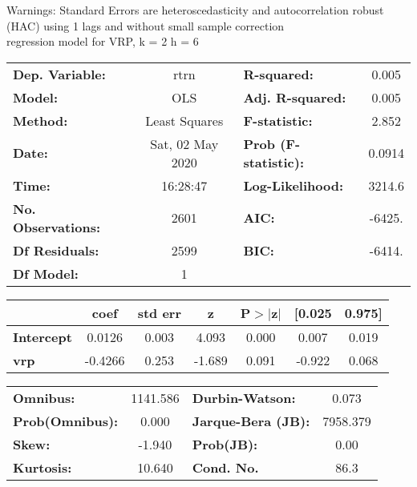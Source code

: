 Warnings: \newline
 [1] Standard Errors are heteroscedasticity and autocorrelation robust (HAC) using 1 lags and without small sample correction\\ 

regression model for VRP, k = 2 h = 6\begin{center}
\begin{tabular}{lclc}
\toprule
\textbf{Dep. Variable:}    &       rtrn       & \textbf{  R-squared:         } &     0.005   \\
\textbf{Model:}            &       OLS        & \textbf{  Adj. R-squared:    } &     0.005   \\
\textbf{Method:}           &  Least Squares   & \textbf{  F-statistic:       } &     2.852   \\
\textbf{Date:}             & Sat, 02 May 2020 & \textbf{  Prob (F-statistic):} &   0.0914    \\
\textbf{Time:}             &     16:28:47     & \textbf{  Log-Likelihood:    } &    3214.6   \\
\textbf{No. Observations:} &        2601      & \textbf{  AIC:               } &    -6425.   \\
\textbf{Df Residuals:}     &        2599      & \textbf{  BIC:               } &    -6414.   \\
\textbf{Df Model:}         &           1      & \textbf{                     } &             \\
\bottomrule
\end{tabular}
\begin{tabular}{lcccccc}
                   & \textbf{coef} & \textbf{std err} & \textbf{z} & \textbf{P$> |$z$|$} & \textbf{[0.025} & \textbf{0.975]}  \\
\midrule
\textbf{Intercept} &       0.0126  &        0.003     &     4.093  &         0.000        &        0.007    &        0.019     \\
\textbf{vrp}       &      -0.4266  &        0.253     &    -1.689  &         0.091        &       -0.922    &        0.068     \\
\bottomrule
\end{tabular}
\begin{tabular}{lclc}
\textbf{Omnibus:}       & 1141.586 & \textbf{  Durbin-Watson:     } &    0.073  \\
\textbf{Prob(Omnibus):} &   0.000  & \textbf{  Jarque-Bera (JB):  } & 7958.379  \\
\textbf{Skew:}          &  -1.940  & \textbf{  Prob(JB):          } &     0.00  \\
\textbf{Kurtosis:}      &  10.640  & \textbf{  Cond. No.          } &     86.3  \\
\bottomrule
\end{tabular}
\end{center}

